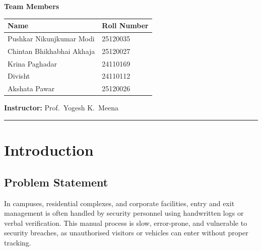 \documentclass[a4paper, 12pt]{article}
\begin{document}
\begin{titlepage}
\begin{center}
\vspace{0.5cm}

{\large\textbf{Team Members}}

\vspace{0.6cm}
\begin{tabular}{ll}
\toprule
\textbf{Name} & \textbf{Roll Number} \\
\midrule
Pushkar Nikunjkumar Modi & 25120035 \\
Chintan Bhikhabhai Akhaja & 25120027 \\
Krina Paghadar & 24110169 \\
Divisht & 24110112 \\
Akshata Pawar & 25120026 \\
\bottomrule
\end{tabular}

\vspace{1.3cm}

\textbf{Instructor:} Prof.\ Yogesh K.\ Meena

\vspace{1cm}

\vfill

\textcolor{iitgnblue}{\rule{\textwidth}{1pt}}

\end{center}
\end{titlepage}

\newpage
\tableofcontents
\newpage
\listoffigures
\listoftables
\newpage

\section{Introduction}
\label{sec:introduction}

\subsection{Problem Statement}

In campuses, residential complexes, and corporate facilities, entry and exit management is often handled by security personnel using handwritten logs or verbal verification. This manual process is slow, error-prone, and vulnerable to security breaches, as unauthorised visitors or vehicles can enter without proper tracking.
\end{document}
